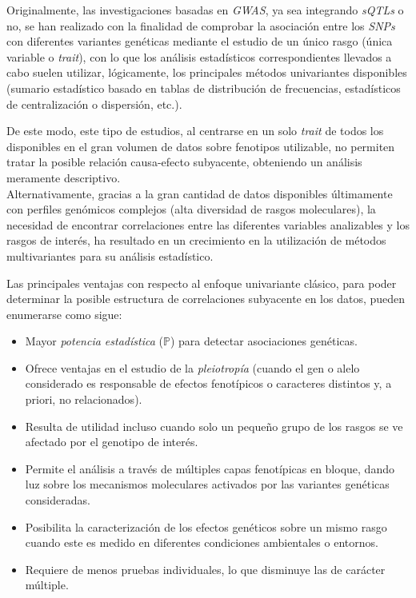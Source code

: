 \documentclass[IB,BIB]{TFUOC}%
\begin{document}

Originalmente, las investigaciones basadas en \textit{GWAS}, ya sea integrando \textit{sQTLs} o no, se han realizado con la finalidad de comprobar la asociación entre los \textit{SNPs} con diferentes variantes genéticas mediante el estudio de un único rasgo (única variable o \textit{\gls{trait}}), con lo que los análisis estadísticos correspondientes llevados a cabo suelen utilizar, lógicamente, los principales métodos univariantes disponibles (sumario estadístico basado en tablas de distribución de frecuencias, estadísticos de centralización o dispersión, etc.).

De este modo, este tipo de estudios, al centrarse en un solo \textit{trait} de todos los disponibles en el gran volumen de datos sobre fenotipos utilizable, no permiten tratar la posible relación causa-efecto subyacente, obteniendo un análisis meramente descriptivo. \\


Alternativamente, gracias a la gran cantidad de datos disponibles últimamente con perfiles genómicos complejos (alta diversidad de rasgos moleculares), la necesidad de encontrar correlaciones entre las diferentes variables analizables y los rasgos de interés, ha resultado en un crecimiento en la utilización de métodos multivariantes para su análisis estadístico.

Las principales ventajas con respecto al enfoque univariante clásico, para poder determinar la posible estructura de correlaciones subyacente en los datos, pueden enumerarse como sigue:

{\small
\begin{itemize}
    \item Mayor \textit{\gls{potencia estadística}} (\( \mathbb P \)) para detectar asociaciones genéticas.
    \item Ofrece ventajas en el estudio de la \hspace{-.25em}\textit{\gls{pleiotropía}} (cuando el gen o alelo considerado es responsable de efectos fenotípicos o caracteres distintos y, a priori, no relacionados).
    \item Resulta de utilidad incluso cuando solo un pequeño grupo de los rasgos se ve afectado por el genotipo de interés.
    \item Permite el análisis a través de múltiples capas fenotípicas en bloque, dando luz sobre los mecanismos moleculares activados por las variantes genéticas consideradas.
    \item Posibilita la caracterización de los efectos genéticos sobre un mismo rasgo cuando este es medido en diferentes condiciones ambientales o entornos.
    \item Requiere de menos pruebas individuales, lo que disminuye las de carácter múltiple.
\end{itemize}}
\end{document}
